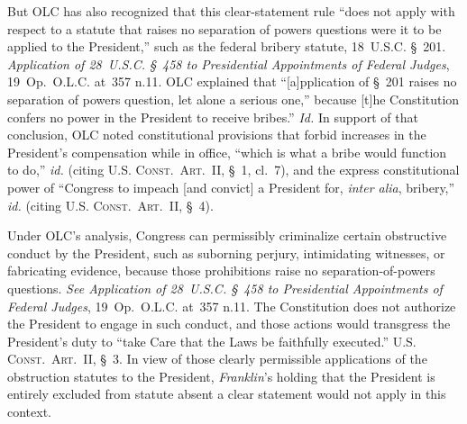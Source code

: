 But OLC has also recognized that this clear-statement rule ``does not apply with respect to a statute that raises no separation of powers questions were it to be applied to the President,'' such as the federal bribery statute, 18~U.S.C. \S~201.
\textit{Application of 28~U.S.C. \S~458 to Presidential Appointments of Federal Judges}, 19~Op.\ O.L.C. at~357 n.11. OLC explained that ``[a]pplication of \S~201 raises no separation of powers question, let alone a serious one,'' because [t]he Constitution confers no power in the President to receive bribes.'' \textit{Id.}
In support of that conclusion, OLC noted constitutional provisions that forbid increases in the President's compensation while in office, ``which is what a bribe would function to do,'' \textit{id.} (citing \textsc{U.S. Const.\ Art.~II}, \S~1, cl.~7), and the express constitutional power of ``Congress to impeach [and convict] a President for, \textit{inter alia}, bribery,'' \textit{id.} (citing \textsc{U.S. Const.\ Art.~II}, \S~4).

Under OLC's analysis, Congress can permissibly criminalize certain obstructive conduct by the President, such as suborning perjury, intimidating witnesses, or fabricating evidence, because those prohibitions raise no separation-of-powers questions.
\textit{See Application of 28~U.S.C. \S~458 to Presidential Appointments of Federal Judges}, 19~Op.\ O.L.C. at~357 n.11.
The Constitution does not authorize the President to engage in such conduct, and those actions would transgress the President's duty to ``take Care that the Laws be faithfully executed.''
\textsc{U.S. Const.\ Art.~II}, \S~3.
In view of those clearly permissible applications of the obstruction statutes to the President, \textit{Franklin}'s holding that the President is entirely excluded from statute absent a clear statement would not apply in this context.

